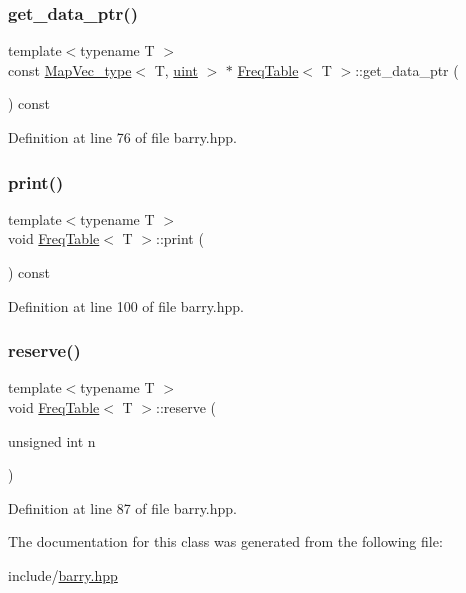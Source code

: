 \subsubsection{\texorpdfstring{get\+\_\+data\+\_\+ptr()}{get\_data\_ptr()}}
{\footnotesize\ttfamily template$<$typename T $>$ \\
const \hyperlink{namespacebarry_a2f0d3aab1d67e4c8eaeab9022e16139f}{Map\+Vec\+\_\+type}$<$ T, \hyperlink{namespacebarry_a11dfc53ddb4672278319aa04f1e09a6c}{uint} $>$ $\ast$ \hyperlink{classbarry_1_1_freq_table}{Freq\+Table}$<$ T $>$\+::get\+\_\+data\+\_\+ptr (\begin{DoxyParamCaption}{ }\end{DoxyParamCaption}) const\hspace{0.3cm}{\ttfamily [inline]}}



Definition at line 76 of file barry.\+hpp.

\mbox{\label{classbarry_1_1_freq_table_a4fe8f5e3b5bf64a1cbaf99deb96298d4}} 
\subsubsection{\texorpdfstring{print()}{print()}}
{\footnotesize\ttfamily template$<$typename T $>$ \\
void \hyperlink{classbarry_1_1_freq_table}{Freq\+Table}$<$ T $>$\+::print (\begin{DoxyParamCaption}{ }\end{DoxyParamCaption}) const\hspace{0.3cm}{\ttfamily [inline]}}



Definition at line 100 of file barry.\+hpp.

\mbox{\label{classbarry_1_1_freq_table_a0bdced25f7c0bee38e073c4654578d19}} 
\subsubsection{\texorpdfstring{reserve()}{reserve()}}
{\footnotesize\ttfamily template$<$typename T $>$ \\
void \hyperlink{classbarry_1_1_freq_table}{Freq\+Table}$<$ T $>$\+::reserve (\begin{DoxyParamCaption}\item[{unsigned int}]{n }\end{DoxyParamCaption})\hspace{0.3cm}{\ttfamily [inline]}}



Definition at line 87 of file barry.\+hpp.



The documentation for this class was generated from the following file\+:\begin{DoxyCompactItemize}
\item 
include/\hyperlink{barry_8hpp}{barry.\+hpp}\end{DoxyCompactItemize}
